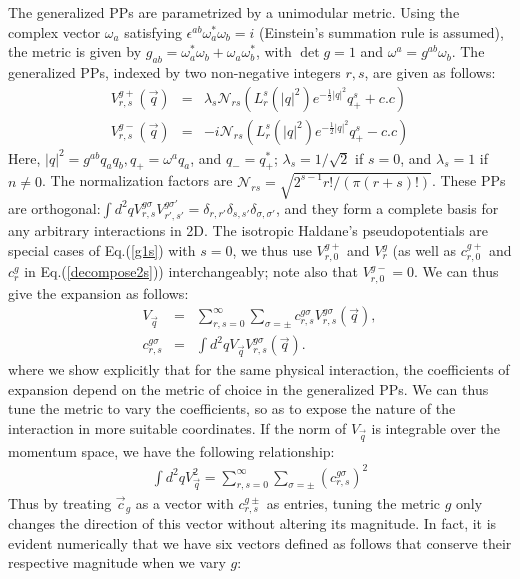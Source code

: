 \documentclass[twocolumn,showpacs,amsmath,amstex,amssymb,mathfonts,prb]{revtex4-1}
\begin{document}
The generalized PPs are parametrized by a unimodular metric. Using the complex vector $\omega_a$ satisfying $\epsilon^{ab}\omega_a^*\omega_b=i$ (Einstein's summation rule is assumed), the metric is given by $g_{ab}=\omega_a^*\omega_b+\omega_a\omega_b^*$, with $\det g=1$ and $\omega^a=g^{ab}\omega_b$. The generalized PPs, indexed by two non-negative integers $r,s$, are given as follows:
\begin{eqnarray}
V_{r,s}^{g+}\left(\vec q\right)&=& \lambda_s \mathcal{N}_{rs} \left(L_r^s\left(|q|^2\right)e^{-\frac{1}{2}|q|^2}q_+^s+c.c\right)\label{g1s}\\
V_{r,s}^{g-}\left(\vec q\right)&=& -i \mathcal{N}_{rs} \left(L_r^s\left(|q|^2\right)e^{-\frac{1}{2}|q|^2}q_+^s-c.c\right)\label{g2s}
\end{eqnarray}
Here, $|q|^2=g^{ab}q_aq_b, q_+=\omega^aq_a$, and $q_-=q_+^*$; $\lambda_s=1/\sqrt{2}$ if $s=0$, and $\lambda_s=1$ if $n\neq 0$. The normalization factors are $\mathcal N_{rs}=\sqrt{2^{s-1}r!/\left(\pi\left(r+s\right)!\right)}$. These PPs are orthogonal:$\int d^2qV_{r,s}^{g\sigma}V_{r',s'}^{g\sigma'}=\delta_{r,r'}\delta_{s,s'}\delta_{\sigma,\sigma'}$, and they form a complete basis for any arbitrary interactions in 2D. The isotropic Haldane's pseudopotentials are special cases of Eq.(\ref{g1s}) with $s=0$, we thus use $V_{r,0}^{g+}$ and $V_r^g$ (as well as $c_{r,0}^{g+}$ and $c_r^g$ in Eq.(\ref{decompose2s})) interchangeably; note also that $V_{r,0}^{g-}=0$. We can thus give the expansion as follows:
\begin{eqnarray}
V_{\vec{q}}&=&\sum_{r,s=0}^\infty \sum_{\sigma=\pm}   c^{g\sigma}_{r,s}V_{r,s}^{g\sigma}(\vec{q}),\label{decompose2s}\\
c^{g\sigma}_{r,s}&=&\int d^2q V_{\vec{q}} V_{r,s}^{g\sigma}\left(\vec q\right).\label{decompose2as}
\end{eqnarray}
where we show explicitly that for the same physical interaction, the coefficients of expansion depend on the metric of choice in the generalized PPs. We can thus tune the metric to vary the coefficients, so as to expose the nature of the interaction in more suitable coordinates. If the norm of $V_{\vec q}$ is integrable over the momentum space, we have the following relationship:
\begin{eqnarray}\label{l2}
\int d^2qV_{\vec q}^2=\sum_{r,s=0}^\infty\sum_{\sigma=\pm}\left(c_{r,s}^{g\sigma}\right)^2
\end{eqnarray}
Thus by treating $\vec c_g$ as a vector with $c_{r,s}^{g\pm}$ as entries, tuning the metric $g$ only changes the direction of this vector without altering its magnitude. In fact, it is evident numerically that we have six vectors defined as follows that conserve their respective magnitude when we vary $g$:
\end{document}
